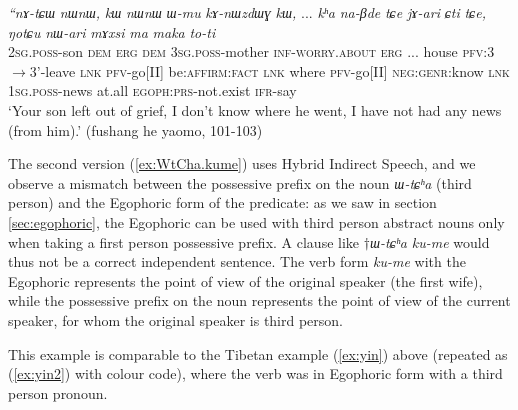 \documentclass[oldfontcommands,oneside,a4paper,11pt]{article}
\newcommand{\ipa}[1]{{\phon\textit{#1}}} %
\newcommand{\refb}[1]{(\ref{#1})}
\newcommand{\bleu}[1]{{\color{blue}#1}}
\begin{document}
\begin{exe}
\ex \label{ex:atCha.kume}
 \gll %
 \ipa{``nɤ-tɕɯ} 	\ipa{nɯnɯ,} 	\ipa{kɯ} 	\ipa{nɯnɯ} 	\ipa{ɯ-mu} 	\ipa{kɤ-nɯzdɯɣ} 	\ipa{kɯ,} 	... 	\ipa{kʰa} 	\ipa{na-βde} 	\ipa{tɕe} 	 	\ipa{jɤ-ari} 	\ipa{ɕti} 	\ipa{tɕe,} 	\ipa{ŋotɕu} 	\ipa{nɯ-ari} 	\ipa{mɤxsi} 	\ipa{ma} 	\bleu{\ipa{a-tɕʰa}} 	\ipa{maka} 	\bleu{\ipa{ku-me"}} 	\ipa{to-ti}  \\
\textsc{2sg.poss}-son \textsc{dem} \textsc{erg} \textsc{dem} \textsc{3sg.poss}-mother \textsc{inf}-\textsc{worry.about}  \textsc{erg} ... house \textsc{pfv}:3$\rightarrow$3'-leave \textsc{lnk} \textsc{pfv}-go[II] be:\textsc{affirm:fact} \textsc{lnk} where \textsc{pfv}-go[II] \textsc{neg:genr}:know \textsc{lnk} \bleu{\textsc{1sg.poss}-news} at.all \bleu{\textsc{egoph:prs}-not.exist} \textsc{ifr}-say \\
\glt `Your son left out of grief, I don't know where he went, I have not had any news (from him).' (fushang he yaomo, 101-103)
\end{exe}

The second version \refb{ex:WtCha.kume} uses Hybrid Indirect Speech, and we observe a mismatch between the possessive prefix on the noun \ipa{ɯ-tɕʰa} (third person) and the Egophoric form of the predicate: as we saw in section \ref{sec:egophoric}, the Egophoric can be used with third person abstract nouns only when taking a first person possessive prefix. A clause like $\dagger$\ipa{ɯ-tɕʰa} 	\ipa{ku-me} would thus not be a correct independent sentence. The verb form \ipa{ku-me} with the Egophoric represents the point of view of the original speaker (the first wife), while the possessive prefix on the noun represents the point of view of the current speaker, for whom the original speaker is third person. 

This example is comparable to the Tibetan example \refb{ex:yin} above (repeated as \refb{ex:yin2} with colour code), where the verb was in Egophoric form with a third person pronoun.
\end{document}
